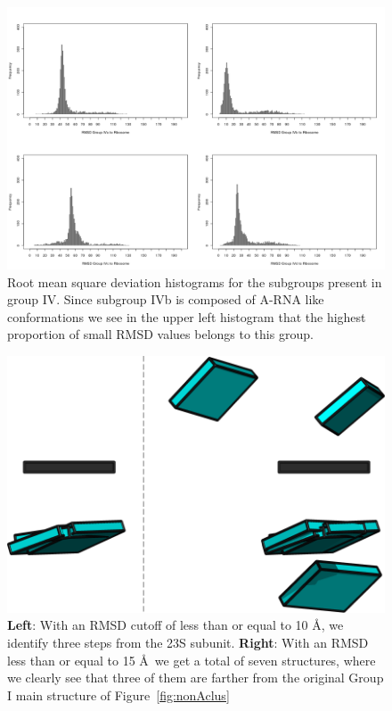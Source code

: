 \begin{figure}[htbp]
 \centering
\includegraphics[angle=90, scale=0.6]{Chapter2/RMSDschneider2.png}
\caption{Root  mean  square  deviation  histograms for  the  subgroups
  present in group IV.  Since subgroup IVb is composed of A-RNA like
  conformations we see in the upper left histogram that the highest
  proportion of small RMSD values belongs to this group.}
 \label{fig:histo2}
\end{figure}

\begin{figure}[htp]
 \centering
\includegraphics[angle=0, scale=0.3]{Chapter2/G1at10_15.png}
\caption{\textbf{Left}: With an RMSD cutoff of less than or equal to
  10 \AA, we identify three steps from the 23S subunit. \textbf{Right}:
  With an RMSD less than or equal to 15 \AA ~we get a total of seven
  structures, where we clearly see that three of them are farther from
the original Group I main structure of Figure~\ref{fig:nonAclus}}
 \label{fig:superimpose}
\end{figure}

